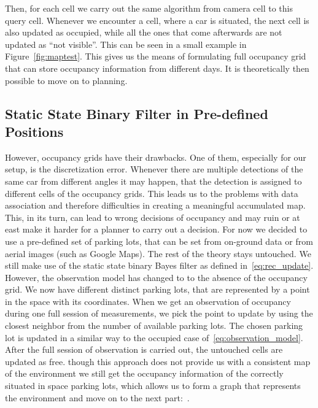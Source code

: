         Then, for each cell we carry out the same algorithm from camera cell to this query cell. Whenever we encounter a cell, where a car is situated, the next cell is also updated as occupied, while all the ones that come afterwards are not updated as ``not visible''.
        This can be seen in a small example in Figure~\ref{fig:maptest}.
        This gives us the means of formulating full occupancy grid that can store occupancy information from different days. It is theoretically then possible to move on to planning.
    \subsection{Static State Binary Filter in Pre-defined Positions}\label{sub:static_state_binary_filter_in_pre_defined_positions}
        However, occupancy grids have their drawbacks. One of them, especially for our setup, is the discretization error. Whenever there are multiple detections of the same car from different angles it may happen, that the detection is assigned to different cells of the occupancy grids. This leads us to the problems with data association and therefore difficulties in creating a meaningful accumulated map. This, in its turn, can lead to wrong decisions of occupancy and may ruin or at east make it harder for a planner to carry out a decision.
        For now we decided to use a pre-defined set of parking lots, that can be set from on-ground data or from aerial images (such as Google Maps). The rest of the theory stays untouched. We still make use of the static state binary Bayes filter as defined in~\eqref{eq:rec_update}. However, the observation model has changed to to the absence of the occupancy grid. We now have different distinct parking lots, that are represented by a point in the space with its coordinates. When we get an observation of occupancy during one full session of measurements, we pick the point to update by using the closest neighbor from the number of available parking lots. The chosen parking lot is updated in a similar way to the occupied case of~\ref{eq:observation_model}. After the full session of observation is carried out, the untouched cells are updated as free.
        though this approach does not provide us with a consistent map of the environment we still get the occupancy information of the correctly situated in space parking lots, which allows us to form a graph that represents the environment and move on to the next part:~.

